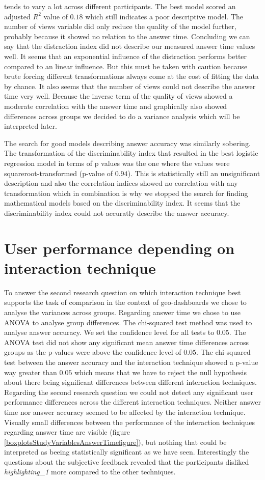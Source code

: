 tends to vary a lot across different participants. The best model scored an adjusted $R^2$ value of $0.18$ which still indicates a poor descriptive model. The
number of views variable did only reduce the quality of the model further, probably because it showed no relation to the answer time. Concluding we can say that the distraction index
did not describe our measured answer time values well. It seems that an exponential influence of the distraction performs better compared to an linear influence.
But this must be taken with caution because brute forcing different transformations always come at the cost of fitting the data by chance. It also seems that the number of views
could not describe the answer time very well. Because the inverse term of the quality of views showed a moderate correlation with the answer time and graphically also showed
differences across groups we decided to do a variance analysis which will be interpreted later.

The search for good models describing answer accuracy was similarly sobering. The transformation of the discriminability index that resulted in
the best logistic regression model in terms of p values was the one where the values were squareroot-transformed (p-value of $0.94$). This is 
statistically still an unsignificant description and also the correlation indices showed no correlation with any transformation which in combination is
why we stopped the search for finding mathematical models based on the discriminability index. It seems that the discriminability index could not
accuratly describe the answer accuracy.
\section{User performance depending on interaction technique}
To answer the second research question on which interaction technique best supports the task of comparison in the context of geo-dashboards we chose to analyse the variances
across groups. Regarding answer time we chose to use ANOVA to analyse group differences. The chi-squared test method was used to analyse answer accuracy.
We set the confidence level for all tests to $0.05$. The ANOVA test did not show any significant mean answer time differences across groups as the p-values were above
the confidence level of $0.05$. The chi-squared test between the
answer accuracy and the interaction technique showed a p-value way greater than $0.05$ which means that we have to reject the null hypothesis about there being significant differences
between different interaction techniques. Regarding the second research question we could not detect any significant user performance differences across the different interaction techniques.
Neither answer time nor answer accuracy seemed to be affected by the interaction technique. Visually small differences between the performance of the interaction techniques regarding answer time
are visible (figure \ref{boxplotsStudyVariablesAnswerTimefigure}), but nothing that could be interpreted as beeing statistically significant as we have seen. Interestingly
the questions about the subjective feedback revealed that the participants disliked \textit{highlighting\_1} more compared to the other techniques.

